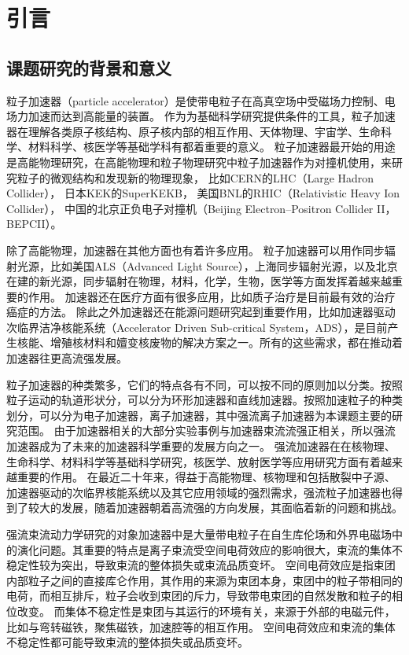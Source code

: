 
\chapter{引言}
\label{chap:Introduction}

\section{课题研究的背景和意义}
\label{section:background}
粒子加速器（particle accelerator）是使带电粒子在高真空场中受磁场力控制、电场力加速而达到高能量的装置。
作为为基础科学研究提供条件的工具，粒子加速器在理解各类原子核结构、原子核内部的相互作用、天体物理、宇宙学、生命科学、材料科学、核医学等基础学科有都着重要的意义。
粒子加速器最开始的用途是高能物理研究，在高能物理和粒子物理研究中粒子加速器作为对撞机使用，来研究粒子的微观结构和发现新的物理现象，
比如CERN的LHC（Large Hadron Collider），
日本KEK的SuperKEKB，
美国BNL的RHIC（Relativistic Heavy Ion Collider），
中国的北京正负电子对撞机（Beijing Electron–Positron Collider II，BEPCII）。

除了高能物理，加速器在其他方面也有着许多应用。
粒子加速器可以用作同步辐射光源，比如美国ALS（Advanced Light Source），上海同步辐射光源，以及北京在建的新光源，同步辐射在物理，材料，化学，生物，医学等方面发挥着越来越重要的作用。
加速器还在医疗方面有很多应用，比如质子治疗是目前最有效的治疗癌症的方法。
除此之外加速器还在能源问题研究起到重要作用，比如加速器驱动次临界洁净核能系统（Accelerator Driven Sub-critical System，ADS），是目前产生核能、增殖核材料和嬗变核废物的解决方案之一。所有的这些需求，都在推动着加速器往更高流强发展。

粒子加速器的种类繁多，它们的特点各有不同，可以按不同的原则加以分类。按照粒子运动的轨道形状分，可以分为环形加速器和直线加速器。按照加速粒子的种类划分，可以分为电子加速器，离子加速器，其中强流离子加速器为本课题主要的研究范围。
由于加速器相关的大部分实验事例与加速器束流流强正相关，所以强流加速器成为了未来的加速器科学重要的发展方向之一。
强流加速器在在核物理、生命科学、材料科学等基础科学研究，核医学、放射医学等应用研究方面有着越来越重要的作用。
在最近二十年来，得益于高能物理、核物理和包括散裂中子源、加速器驱动的次临界核能系统以及其它应用领域的强烈需求，强流粒子加速器也得到了较大的发展\cite{wei2003synchrotrons,chou2002synchrotron}，随着加速器朝着高流强的方向发展，其面临着新的问题和挑战。

强流束流动力学研究的对象加速器中是大量带电粒子在自生库伦场和外界电磁场中的演化问题。其重要的特点是离子束流受空间电荷效应的影响很大，束流的集体不稳定性较为突出，导致束流的整体损失或束流品质变坏。
空间电荷效应是指束团内部粒子之间的直接库仑作用，其作用的来源为束团本身，束团中的粒子带相同的电荷，而相互排斥，粒子会收到束团的斥力，导致带电束团的自然发散和粒子的相位改变。
而集体不稳定性是束团与其运行的环境有关，来源于外部的电磁元件，比如与弯转磁铁，聚焦磁铁，加速腔等的相互作用。
空间电荷效应和束流的集体不稳定性都可能导致束流的整体损失或品质变坏。


